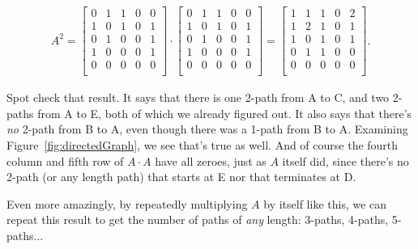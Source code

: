 \begin{alttitles}
\vspace{-.15in}
\label{adjacencySquared}
\begin{align*}
A^2 =
\begin{bmatrix}
0 & 1 & 1 & 0 & 0 \\
1 & 0 & 1 & 0 & 1 \\
0 & 1 & 0 & 0 & 1 \\
1 & 0 & 0 & 0 & 1 \\
0 & 0 & 0 & 0 & 0 \\
\end{bmatrix} \cdot
\begin{bmatrix}
0 & 1 & 1 & 0 & 0 \\
1 & 0 & 1 & 0 & 1 \\
0 & 1 & 0 & 0 & 1 \\
1 & 0 & 0 & 0 & 1 \\
0 & 0 & 0 & 0 & 0 \\
\end{bmatrix} =
\begin{bmatrix}
1 & 1 & 1 & 0 & 2 \\
1 & 2 & 1 & 0 & 1 \\
1 & 0 & 1 & 0 & 1 \\
0 & 1 & 1 & 0 & 0 \\
0 & 0 & 0 & 0 & 0 \\
\end{bmatrix}.
\end{align*}
\vspace{-.15in}

Spot check that result. It says that there is one 2-path from A to C, and two
2-paths from A to E, both of which we already figured out. It also says that
there's \textit{no} 2-path from B to A, even though there was a 1-path from B
to A. Examining Figure~\ref{fig:directedGraph}, we see that's true as well. And
of course the fourth column and fifth row of $A\cdot A$ have all zeroes, just
as $A$ itself did, since there's no 2-path (or any length path) that starts at
E nor that terminates at D.

Even more amazingly, by repeatedly multiplying $A$ by itself like this, we can
repeat this result to get the number of paths of \textit{any} length: 3-paths,
4-paths, 5-paths...


\end{alttitles}
